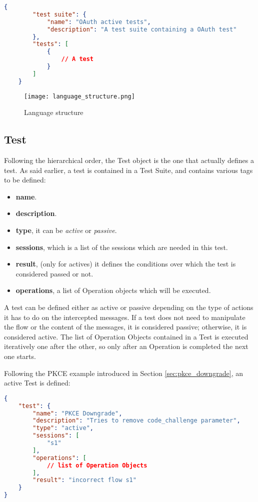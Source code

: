 \begin{lstlisting}[language=json, caption=Test Suite definition, label={lst:test_suite_definition}]
    {
        "test suite": {
            "name": "OAuth active tests",
            "description": "A test suite containing a OAuth test"
        },
        "tests": [
            {
                // A test
            }
        ]
    }
\end{lstlisting}

\begin{figure}[h]
    \texttt{[image: language\_structure.png]}
    \caption{Language structure}
    \label{fig:language_structure}
\end{figure}

\subsection{Test}
Following the hierarchical order, the Test object is the one that actually defines a test. As said earlier, a test is contained in a Test Suite, and contains various tags to be defined:
\begin{itemize}
    \item \textbf{name}.
    \item \textbf{description}.
    \item \textbf{type}, it can be \textit{active} or \textit{passive}.
    \item \textbf{sessions}, which is a list of the sessions which are needed in this test.
    \item \textbf{result}, (only for actives) it defines the conditions over which the test is considered passed or not.
    \item \textbf{operations}, a list of Operation objects which will be executed.
\end{itemize}
A test can be defined either as active or passive depending on the type of actions it has to do on the intercepted messages. If a test does not need to manipulate the flow or the content of the messages, it is considered passive; otherwise, it is considered active.
The list of Operation Objects contained in a Test is executed iteratively one after the other, so only after an Operation is completed the next one starts.

Following the \gls{PKCE} example introduced in Section \ref{sec:pkce_downgrade}, an active Test is defined:

\begin{lstlisting}[language=json, caption=Active test definition, label={lst:active_test_definition}]
{
    "test": {
        "name": "PKCE Downgrade",
        "description": "Tries to remove code_challenge parameter",
        "type": "active",
        "sessions": [
            "s1"
        ],
        "operations": [
            // list of Operation Objects
        ],
        "result": "incorrect flow s1"
    }
}    
\end{lstlisting} 

